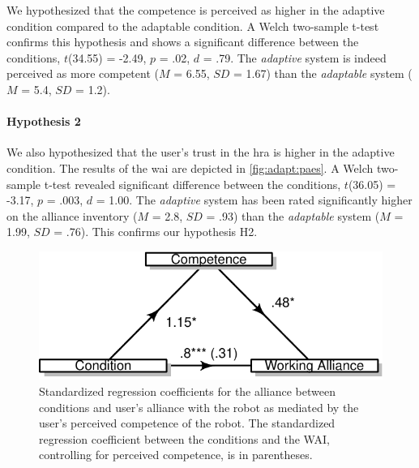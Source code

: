 \documentclass[twocolumn]{svjour3}          %
\begin{document}
We hypothesized that the competence is perceived as higher in the adaptive condition compared to the adaptable condition. A Welch two-sample t-test confirms this hypothesis and shows a significant difference between the conditions,
\(t\)(34.55) = -2.49, \(p\) = .02, \(d\) = .79. The \textit{adaptive} system is indeed
perceived as more competent (\(M\) = 6.55, \(SD\) = 1.67) than the
\textit{adaptable} system (\(M\) = 5.4, \(SD\) = 1.2).
% 
% 


\hypertarget{working-alliance}{%
\paragraph{Hypothesis 2}\label{working-alliance}}
We also hypothesized that the user's trust in the \gls{hra} is higher in the adaptive condition. The results of the \gls{wai} are depicted in \autoref{fig:adapt:paes}. A Welch
two-sample t-test revealed significant difference between the
conditions, \(t\)(36.05) = -3.17, \(p\) = .003, \(d\) = 1.00. The
\textit{adaptive} system has been rated significantly higher on the alliance
inventory (\(M\) = 2.8, \(SD\) = .93) than the \textit{adaptable} system (\(M\) =
1.99, \(SD\) = .76). This confirms our hypothesis H2.

\begin{figure}[bt!]
\includegraphics[width=\columnwidth]{figures/figure-latex/unnamed-chunk-9-1} \caption{\label{fig:adapt:mediation}Standardized regression coefficients for the alliance between conditions and user's alliance with the robot as mediated by the user's perceived competence of the robot. The standardized regression coefficient between the conditions and the WAI, controlling for perceived competence, is in parentheses.}\label{fig:unnamed-chunk-9}
\end{figure}
\end{document}
